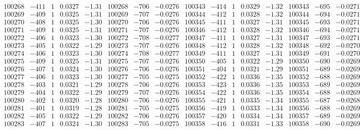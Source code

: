 \documentclass[11pt,reqno,a4letter]{article}
\numberwithin{figure}{section}
\numberwithin{table}{section}
\theoremstyle{plain}
\numberwithin{theorem}{section}
\theoremstyle{definition}
\begin{document}
\begin{table}[ht!]
\begin{equation*}
{\begin{array}{ccccc|ccc||ccccc|ccc}
100268 & -411 & 1 & 0.0327 & -1.31 & 100268 & -706 & -0.0276 & 100343 & -414 & 1 & 0.0329 & -1.32 & 100343 & -695 & -0.0271  \\
100269 & -409 & 1 & 0.0325 & -1.31 & 100269 & -707 & -0.0276 & 100344 & -412 & 1 & 0.0328 & -1.32 & 100344 & -694 & -0.0271  \\
100270 & -408 & 1 & 0.0325 & -1.30 & 100270 & -706 & -0.0276 & 100345 & -411 & 1 & 0.0327 & -1.31 & 100345 & -693 & -0.0271  \\
100271 & -409 & 1 & 0.0325 & -1.31 & 100271 & -707 & -0.0276 & 100346 & -412 & 1 & 0.0328 & -1.32 & 100346 & -694 & -0.0271  \\
100272 & -406 & 1 & 0.0323 & -1.30 & 100272 & -708 & -0.0277 & 100347 & -411 & 1 & 0.0327 & -1.31 & 100347 & -693 & -0.0271  \\
100273 & -405 & 1 & 0.0322 & -1.29 & 100273 & -707 & -0.0276 & 100348 & -412 & 1 & 0.0328 & -1.32 & 100348 & -692 & -0.0270  \\
100274 & -406 & 1 & 0.0323 & -1.30 & 100274 & -708 & -0.0277 & 100349 & -411 & 1 & 0.0327 & -1.31 & 100349 & -691 & -0.0270  \\
100275 & -409 & 1 & 0.0325 & -1.31 & 100275 & -707 & -0.0276 & 100350 & -405 & 1 & 0.0322 & -1.29 & 100350 & -690 & -0.0269  \\
100276 & -407 & 1 & 0.0324 & -1.30 & 100276 & -706 & -0.0276 & 100351 & -404 & 1 & 0.0321 & -1.29 & 100351 & -689 & -0.0269  \\
100277 & -406 & 1 & 0.0323 & -1.30 & 100277 & -705 & -0.0275 & 100352 & -422 & 1 & 0.0336 & -1.35 & 100352 & -688 & -0.0269  \\
100278 & -403 & 1 & 0.0321 & -1.29 & 100278 & -706 & -0.0276 & 100353 & -423 & 1 & 0.0336 & -1.35 & 100353 & -689 & -0.0269  \\
100279 & -404 & 1 & 0.0322 & -1.29 & 100279 & -707 & -0.0276 & 100354 & -422 & 1 & 0.0336 & -1.35 & 100354 & -688 & -0.0269  \\
100280 & -402 & 1 & 0.0320 & -1.28 & 100280 & -706 & -0.0276 & 100355 & -421 & 1 & 0.0335 & -1.34 & 100355 & -687 & -0.0268  \\
100281 & -401 & 1 & 0.0319 & -1.28 & 100281 & -705 & -0.0275 & 100356 & -419 & 1 & 0.0333 & -1.34 & 100356 & -688 & -0.0269  \\
100282 & -405 & 1 & 0.0322 & -1.29 & 100282 & -706 & -0.0276 & 100357 & -420 & 1 & 0.0334 & -1.34 & 100357 & -689 & -0.0269  \\
100283 & -407 & 1 & 0.0324 & -1.30 & 100283 & -705 & -0.0275 & 100358 & -416 & 1 & 0.0331 & -1.33 & 100358 & -690 & -0.0269  \\

\end{array}}
\end{equation*}
\end{table}
\end{document}
